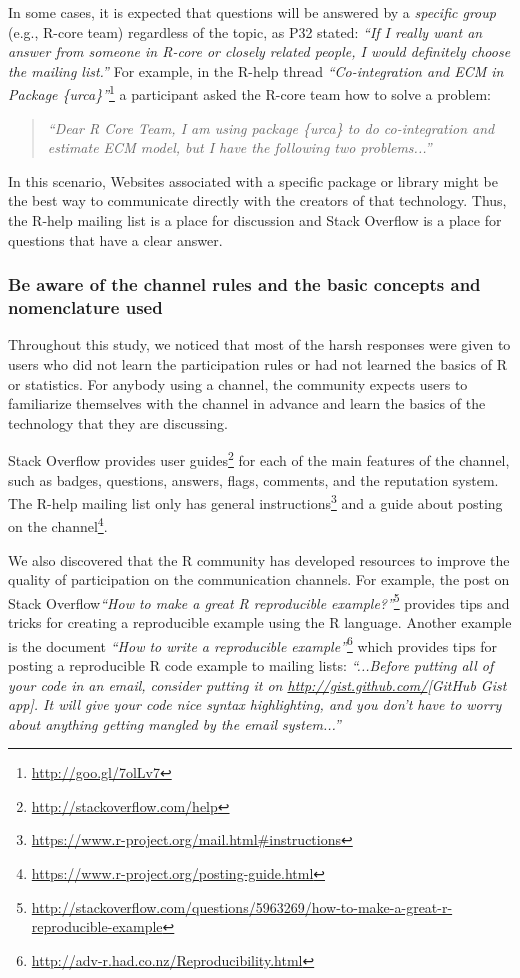 \documentclass[smallextended]{svjour3}       %
\newcommand{\SO}{Stack Overflow\xspace}
\newcommand{\RH}{R-help\xspace}
\newcommand{\recb}{Be aware of the channel rules and the basic concepts and nomenclature used}
\begin{document}
    In some cases, it is expected that questions will be answered by a \textit{specific group} (e.g., R-core team) regardless of the topic, as P32 stated: \textit{``If I really want an answer from someone in R-core or closely related people, I would definitely choose the mailing list.''}
    For example, in the \RH thread \textit{``Co-integration and ECM in Package \{urca\}''}\footnote{\url{http://goo.gl/7olLv7}} a participant asked the R-core team how to solve a problem: 
     \begin{quote}
     \textit{``Dear R Core Team, I am using package \{urca\} to do co-integration and estimate ECM model, but I have the following two problems...''}
     \end{quote}
    In this scenario, Websites associated with a specific package or library might be the best way to communicate directly with the creators of that technology. Thus, the \RH mailing list is a place for discussion and \SO is a place for questions that have a clear answer.

     





\subsubsection{\recb}

    Throughout this study, we noticed that most of the harsh responses were given to users who did not learn the participation rules or had not learned the basics of R or statistics.
    For anybody using a channel, the community expects users to familiarize themselves with the channel in advance and learn the basics of the technology that they are discussing.

    
    \SO provides user guides\footnote{\url{http://stackoverflow.com/help}} for each of the main features of the channel, such as badges, questions,
    answers, flags, comments, and the reputation system. The \RH mailing list only has general instructions\footnote{\url{https://www.r-project.org/mail.html\#instructions}} and a guide about posting on the channel\footnote{\url{https://www.r-project.org/posting-guide.html}}.

We also discovered that the R community has developed resources to improve the quality of participation on the communication channels.
    For example, the post on \SO \textit{``How to make a great R reproducible example?''}\footnote{\href{http://stackoverflow.com/questions/5963269/how-to-make-a-great-r-reproducible-example}{http://stackoverflow.com/questions/5963269/how-to-make-a-great-r-reproducible-example}} provides tips and tricks for creating a reproducible example using the R language.
    Another example is the document \textit{``How to write a reproducible
      example''}\footnote{\url{http://adv-r.had.co.nz/Reproducibility.html}} which provides tips for posting a reproducible R code example to mailing lists: \textit{``...Before putting all of your code in an email, consider putting it on \url{http://gist.github.com/}{[GitHub Gist app]}. It will give your code nice syntax highlighting, and you don't have to worry about anything getting mangled by the email system...''}
\end{document}
